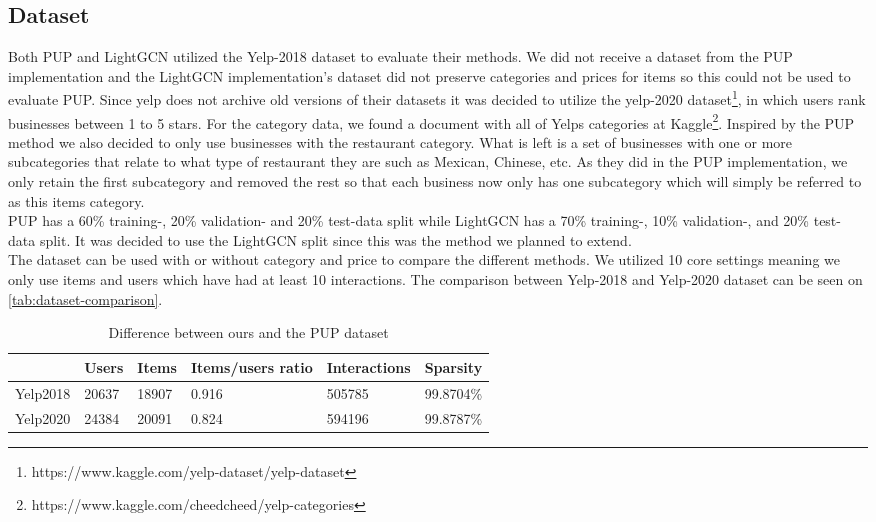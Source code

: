 \subsection{Dataset} \label{equal-data}
Both PUP and LightGCN utilized the Yelp-2018 dataset to evaluate their methods.
We did not receive a dataset from the PUP implementation and the LightGCN implementation's dataset did not preserve categories and prices for items so this could not be used to evaluate PUP.
Since yelp does not archive old versions of their datasets it was decided to utilize the yelp-2020 dataset\footnote{https://www.kaggle.com/yelp-dataset/yelp-dataset}, in which users rank businesses between 1 to 5 stars.
For the category data, we found a document with all of Yelps categories at Kaggle\footnote{https://www.kaggle.com/cheedcheed/yelp-categories}.
Inspired by the PUP method we also decided to only use businesses with the restaurant category.
What is left is a set of businesses with one or more subcategories that relate to what type of restaurant they are such as Mexican, Chinese, etc.
As they did in the PUP implementation, we only retain the first subcategory and removed the rest so that each business now only has one subcategory which will simply be referred to as this items category.
\\
PUP has a 60\% training-, 20\% validation- and 20\% test-data split while LightGCN has a 70\% training-, 10\% validation-, and 20\% test-data split.
It was decided to use the LightGCN split since this was the method we planned to extend.
\\
The dataset can be used with or without category and price to compare the different methods.
We utilized 10 core settings meaning we only use items and users which have had at least 10 interactions.
The comparison between Yelp-2018 and Yelp-2020 dataset can be seen on \autoref{tab:dataset-comparison}.
\begin{table*}[]
    \centering
    \begin{tabular}{|l|l|l|l|l|l|}
    \hline
                 & Users & Items & Items/users ratio & Interactions & Sparsity  \\ \hline
        Yelp2018 & 20637 & 18907 & 0.916             & 505785       & 99.8704\% \\ \hline
        Yelp2020 & 24384 & 20091 & 0.824             & 594196       & 99.8787\% \\ \hline
    \end{tabular}
    \caption{Difference between ours and the PUP dataset}
    \label{tab:dataset-comparison}
\end{table*}
